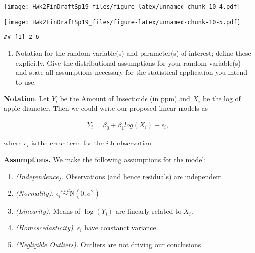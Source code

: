 \documentclass[12pt,]{article}
\newenvironment{Shaded}{\begin{snugshade}}{\end{snugshade}}
\newcommand{\KeywordTok}[1]{\textcolor[rgb]{0.13,0.29,0.53}{\textbf{#1}}}
\newcommand{\OperatorTok}[1]{\textcolor[rgb]{0.81,0.36,0.00}{\textbf{#1}}}
\newcommand{\NormalTok}[1]{#1}
\providecommand{\tightlist}{%
  \setlength{\itemsep}{0pt}\setlength{\parskip}{0pt}}
\begin{document}
\texttt{[image: Hwk2FinDraftSp19\_files/figure-latex/unnamed-chunk-10-4.pdf]}

\begin{Shaded}
\end{Shaded}

\texttt{[image: Hwk2FinDraftSp19\_files/figure-latex/unnamed-chunk-10-5.pdf]}

\begin{verbatim}
## [1] 2 6
\end{verbatim}

\begin{enumerate}
\def\labelenumi{\alph{enumi})}
\setcounter{enumi}{1}
\tightlist
\item
  Notation for the random variable(s) and parameter(s) of interest;
  define these explicitly. Give the distributional assumptions for your
  random variable(s) and state all assumptions necessary for the
  statistical application you intend to use.
\end{enumerate}

\textbf{Notation.} Let \(Y_i\) be the Amount of Insecticide (in ppm) and
\(X_i\) be the log of apple diameter. Then we could write our proposed
linear models as

\begin{align}
Y_i=\beta_0+\beta_1log(X_i)+\epsilon_i,
\end{align}

where \(\epsilon_i\) is the error term for the \(i\)th observation.

\textbf{Assumptions.} We make the following assumptions for the model:

\begin{enumerate}
\item \emph{(Independence).} Observations (and hence residuals) are independent
\item \emph{(Normality).} $\epsilon_i\overset{i.i.d}{\sim}\mathrm{N}(0,\sigma^2)$
\item \emph{(Linearity).} Means of $\log(Y_i)$ are linearly related to $X_i$.
\item \emph{(Homoscedasticity).} $\epsilon_i$ have constanct variance.
\item \emph{(Negligible Outliers).} Outliers are not driving our conclusions
\end{enumerate}
\end{document}

